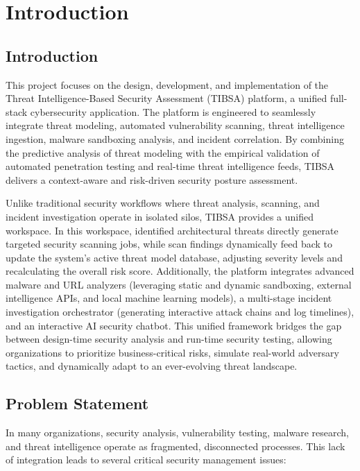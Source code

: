 \chapter{Introduction}
\label{ch:chapter1}

\section{Introduction}

This project focuses on the design, development, and implementation of the Threat Intelligence-Based Security Assessment (TIBSA) platform, a unified full-stack cybersecurity application. The platform is engineered to seamlessly integrate threat modeling, automated vulnerability scanning, threat intelligence ingestion, malware sandboxing analysis, and incident correlation. By combining the predictive analysis of threat modeling with the empirical validation of automated penetration testing and real-time threat intelligence feeds, TIBSA delivers a context-aware and risk-driven security posture assessment.

Unlike traditional security workflows where threat analysis, scanning, and incident investigation operate in isolated silos, TIBSA provides a unified workspace. In this workspace, identified architectural threats directly generate targeted security scanning jobs, while scan findings dynamically feed back to update the system's active threat model database, adjusting severity levels and recalculating the overall risk score. Additionally, the platform integrates advanced malware and URL analyzers (leveraging static and dynamic sandboxing, external intelligence APIs, and local machine learning models), a multi-stage incident investigation orchestrator (generating interactive attack chains and log timelines), and an interactive AI security chatbot. This unified framework bridges the gap between design-time security analysis and run-time security testing, allowing organizations to prioritize business-critical risks, simulate real-world adversary tactics, and dynamically adapt to an ever-evolving threat landscape.

\section{Problem Statement}

In many organizations, security analysis, vulnerability testing, malware research, and threat intelligence operate as fragmented, disconnected processes. This lack of integration leads to several critical security management issues:

